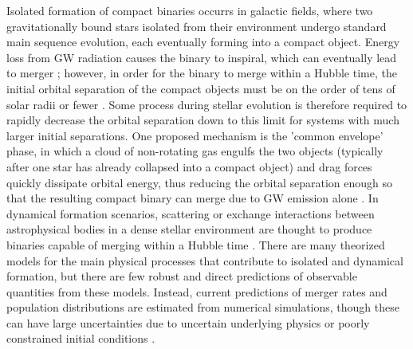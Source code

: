 Isolated formation of compact binaries occurrs in galactic fields, where two gravitationally bound stars isolated from their environment undergo standard main sequence evolution, each eventually forming into a compact object. Energy loss from GW radiation causes the binary to inspiral, which can eventually lead to merger \citep{10.1051/0004-6361/201936204}; however, in order for the binary to merge within a Hubble time, the initial orbital separation of the compact objects must be on the order of tens of solar radii or fewer . Some process during stellar evolution is therefore required to rapidly decrease the orbital separation down to this limit for systems with much larger initial separations. One proposed mechanism is the 'common envelope' phase, in which a cloud of non-rotating gas engulfs the two objects (typically after one star has already collapsed into a compact object) and drag forces quickly dissipate orbital energy, thus reducing the orbital separation enough so that the resulting compact binary can merge due to GW emission alone \citep{10.1038/nature18322}. In dynamical formation scenarios, scattering or exchange interactions between astrophysical bodies in a dense stellar environment are thought to produce binaries capable of merging within a Hubble time \citep{1602.02444}. There are many theorized models for the main physical processes that contribute to isolated and dynamical formation, but there are few robust and direct predictions of observable quantities from these models. Instead, current predictions of merger rates and population distributions are estimated from numerical simulations, though these can have large uncertainties due to uncertain underlying physics or poorly constrained initial conditions \citep{10.1007/s41114-021-00034-3, 10.1051/0004-6361/201936204, 1806.00001v3, 1308.1546}. 

